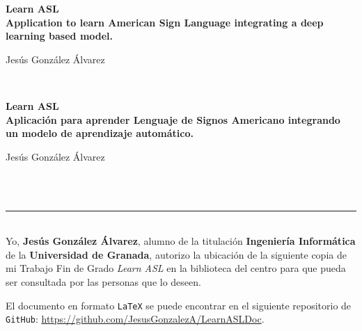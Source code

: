 \thispagestyle{empty}

\begin{center}
{\large\bfseries Learn ASL \\ Application to learn American Sign Language integrating a deep learning based model.}\\
\end{center}
\begin{center}
Jesús González Álvarez\\
\end{center}


\vspace{0.5cm}
\vspace{0.7cm}

\\
	

\cleardoublepage

\begin{center}
	{\large\bfseries Learn ASL \\ Aplicación para aprender Lenguaje de Signos Americano integrando un modelo de aprendizaje automático.}\\
\end{center}
\begin{center}
	Jesús González Álvarez\\
\end{center}
\vspace{0.5cm}
\vspace{0.7cm}

\\

\newpage
\thispagestyle{empty}
\
\vspace{3cm}

\noindent\rule[-1ex]{\textwidth}{2pt}\\[4.5ex]

Yo, \textbf{Jesús González Álvarez}, alumno de la titulación \textbf{Ingeniería Informática} de la \textbf{Universidad de Granada}, autorizo la ubicación de la siguiente copia de mi Trabajo Fin de Grado \textit{Learn ASL} en la biblioteca del centro para que pueda ser consultada por las personas que lo deseen.

\bigskip
El documento en formato {\tt LaTeX} se puede encontrar en el siguiente repositorio de {\tt GitHub}: \url{https://github.com/JesusGonzalezA/LearnASLDoc}.

